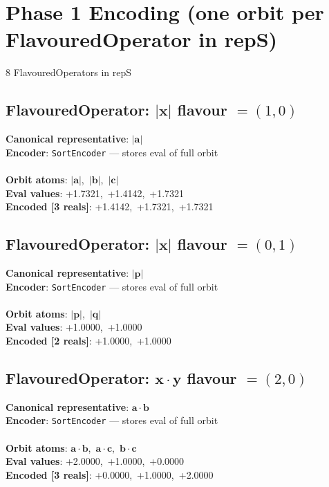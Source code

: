 \documentclass[a4paper,11pt]{article}
\newcommand{\vc}[1]{\ensuremath{\mathbf{#1}}}
\newcommand{\dnfagmiihhiejm}[1]{|\vc{#1}|}
\newcommand{\pdcegfomjfhook}[2]{\mathbf{#1} \cdot \mathbf{#2}}
\begin{document}
\section{Phase 1 Encoding  (one orbit per FlavouredOperator in repS)}
  8 FlavouredOperators in repS


\subsection{FlavouredOperator: $\dnfagmiihhiejm{x}$  flavour $= (1, 0)$}
\textbf{  Canonical representative}: $\displaystyle\dnfagmiihhiejm{a}$\\
\textbf{  Encoder}: \texttt{SortEncoder} — stores eval of full orbit\\\\
\textbf{  Orbit atoms}: $\dnfagmiihhiejm{a}$,\ $\dnfagmiihhiejm{b}$,\ $\dnfagmiihhiejm{c}$\\
\textbf{  Eval values}: +1.7321,\ +1.4142,\ +1.7321\\
\textbf{  Encoded [3 reals]}: +1.4142,\ +1.7321,\ +1.7321\\

\subsection{FlavouredOperator: $\dnfagmiihhiejm{x}$  flavour $= (0, 1)$}
\textbf{  Canonical representative}: $\displaystyle\dnfagmiihhiejm{p}$\\
\textbf{  Encoder}: \texttt{SortEncoder} — stores eval of full orbit\\\\
\textbf{  Orbit atoms}: $\dnfagmiihhiejm{p}$,\ $\dnfagmiihhiejm{q}$\\
\textbf{  Eval values}: +1.0000,\ +1.0000\\
\textbf{  Encoded [2 reals]}: +1.0000,\ +1.0000\\

\subsection{FlavouredOperator: $\pdcegfomjfhook{x}{y}$  flavour $= (2, 0)$}
\textbf{  Canonical representative}: $\displaystyle\pdcegfomjfhook{a}{b}$\\
\textbf{  Encoder}: \texttt{SortEncoder} — stores eval of full orbit\\\\
\textbf{  Orbit atoms}: $\pdcegfomjfhook{a}{b}$,\ $\pdcegfomjfhook{a}{c}$,\ $\pdcegfomjfhook{b}{c}$\\
\textbf{  Eval values}: +2.0000,\ +1.0000,\ +0.0000\\
\textbf{  Encoded [3 reals]}: +0.0000,\ +1.0000,\ +2.0000\\
\end{document}
